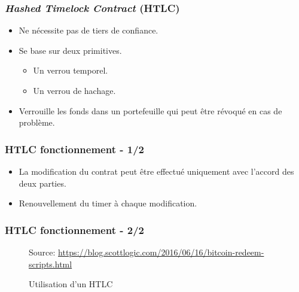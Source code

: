 
\begin{frame}
	\frametitle{\textit{Hashed Timelock Contract} (HTLC)}
	\begin{itemize}
		\item Ne nécessite pas de tiers de confiance.
		\item Se base sur deux primitives.
		      \begin{itemize}
			      \item Un verrou temporel.
			      \item Un verrou de hachage.
		      \end{itemize}
		\item Verrouille les fonds dans un portefeuille qui peut être révoqué en cas de problème.
	\end{itemize}
\end{frame}

\begin{frame}
	\frametitle{HTLC fonctionnement - 1/2}
	\begin{itemize}
		\item La modification du contrat peut être effectué uniquement avec l'accord des deux parties.
		\item Renouvellement du timer à chaque modification.
	\end{itemize}
\end{frame}

\begin{frame}
	\frametitle{HTLC fonctionnement - 2/2}

	\begin{figure}[h!]

		{\scriptsize
			Source: \url{https://blog.scottlogic.com/2016/06/16/bitcoin-redeem-scripts.html}}
		\caption[short]{Utilisation d'un HTLC}
	\end{figure}

\end{frame}

